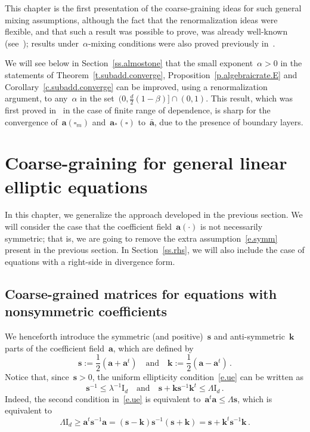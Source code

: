 \documentclass[11pt,twoside]{article} %
\let\oldsquare\square %
\renewcommand{\square}{\oldsquare}
\numberwithin{equation}{section}
\theoremstyle{definition}
\newcommand*{\Id}{\ensuremath{\mathrm{I}_d}}
\newcommand{\s}{\mathbf{s}}
\renewcommand{\a}{\mathbf{a}}
\renewcommand{\k}{\mathbf{k}}
\newcommand{\ahom}{\bar{\a}}
\newcommand{\cu}{\square}
\begin{document}
This chapter is the first presentation of the coarse-graining ideas for such general mixing assumptions, although the fact that the renormalization ideas were flexible, and that such a result was possible to prove, was already well-known (see~\cite[page xxiv]{AKMBook}); results under~$\alpha$-mixing conditions were also proved previously in~\cite{AM}.

We will see below in Section~\ref{ss.almostone} that the small exponent~$\alpha>0$ in the statements of Theorem~\ref{t.subadd.converge}, Proposition~\ref{p.algebraicrate.E} and Corollary~\ref{c.subadd.converge} can be improved, using a renormalization argument, to any~$\alpha$ in the set~$(0, \frac d2(1-\beta)] \cap (0,1)$. This result, which was first proved in~\cite{AKM1} in the case of finite range of dependence, is sharp for the convergence of~$\a(\cu_m)$ and~$\a_*(\cu)$ to~$\ahom$, due to the presence of boundary layers.


\section{Coarse-graining for general linear elliptic equations}
\label{s.nonsymm}

In this chapter, we generalize the approach developed in the previous section. We will consider the case that the coefficient field~$\a(\cdot)$ is not necessarily symmetric; that is, we are going to remove the extra assumption~\eqref{e.symm} present in the previous section. In Section~\ref{ss.rhs}, we will also include the case of equations with a right-side in divergence form. 

\subsection{Coarse-grained matrices for equations with nonsymmetric coefficients}
\label{ss.nonsymm}

We henceforth introduce the symmetric (and positive)~$\s$ and anti-symmetric~$\k$ parts of the coefficient field~$\a$, which are defined by 
\begin{equation}
\label{e.a.symmetric.parts}
\s := \frac12(\a+\a^t)
\quad \mbox{and} \quad 
\k := \frac12(\a-\a^t)\,. 
\end{equation}
Notice that, since~$\s>0$, the uniform ellipticity condition~\eqref{e.ue} can be written as 
\begin{equation}
\label{e.ellipticity.nonsymm}
\s^{-1} \leq \lambda^{-1}  \Id 
\quad \mbox{and} \quad
\s + \k\s^{-1}\k^t \leq \Lambda  \Id\,.
\end{equation}
Indeed, the second condition in~\eqref{e.ue} is equivalent to~$\a^t \a \leq \Lambda \s$, which is equivalent to
\begin{equation*}
\Lambda  \Id \geq \a^t \s^{-1} \a  =  
 (\s-\k) \s^{-1} (\s+\k) = \s + \k^t \s^{-1} \k \,.
\end{equation*}
\end{document}
